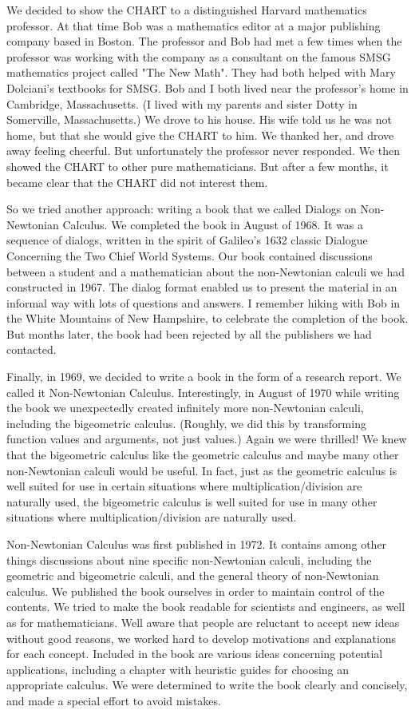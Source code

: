 \documentclass[12pt]{article}
\begin{document}
We decided to show the CHART to a distinguished Harvard mathematics professor. At that time Bob was a mathematics editor at a major publishing company based in Boston. The professor and Bob had met a few times when the professor was working with the company as a consultant on the famous SMSG mathematics project called "The New Math". They had both helped with Mary Dolciani's textbooks for SMSG. Bob and I both lived near the professor's home in Cambridge, Massachusetts. (I lived with my parents and sister Dotty in Somerville, Massachusetts.) We drove to his house. His wife told us he was not home, but that she would give the CHART to him. We thanked her, and drove away feeling cheerful. But unfortunately the professor never responded. We then showed the CHART to other pure mathematicians. But after a few months, it became clear that the CHART did not interest them.

So we tried another approach: writing a book that we called Dialogs on Non-Newtonian Calculus. We completed the book in August of 1968. It was a sequence of dialogs, written in the spirit of Galileo's 1632 classic Dialogue Concerning the Two Chief World Systems. Our book contained discussions between a student and a mathematician about the non-Newtonian calculi we had constructed in 1967. The dialog format enabled us to present the material in an informal way with lots of questions and answers. I remember hiking with Bob in the White Mountains of New Hampshire, to celebrate the completion of the book. But months later, the book had been rejected by all the publishers we had contacted.

Finally, in 1969, we decided to write a book in the form of a research report. We called it Non-Newtonian Calculus. Interestingly, in August of 1970 while writing the book we unexpectedly created infinitely more non-Newtonian calculi, including the bigeometric calculus. (Roughly, we did this by transforming function values and arguments, not just values.) Again we were thrilled! We knew that the bigeometric calculus like the geometric calculus and maybe many other non-Newtonian calculi would be useful. In fact, just as the geometric calculus is well suited for use in certain situations where multiplication/division are naturally used, the bigeometric calculus is well suited for use in many other situations where multiplication/division are naturally used.          

Non-Newtonian Calculus was first published in 1972. It contains among other things discussions about nine specific non-Newtonian calculi, including the geometric and bigeometric calculi, and the general theory of non-Newtonian calculus. We published the book ourselves in order to maintain control of the contents. We tried to make the book readable for scientists and engineers, as well as for mathematicians. Well aware that people are reluctant to accept new ideas without good reasons, we worked hard to develop motivations and explanations for each concept. Included in the book are various ideas concerning potential applications, including a chapter with heuristic guides for choosing an appropriate calculus. We were determined to write the book clearly and concisely, and made a special effort to avoid mistakes.
\end{document}
